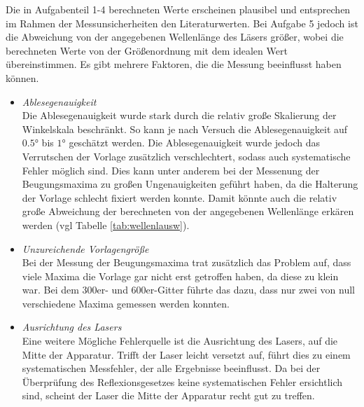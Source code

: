 Die in Aufgabenteil 1-4 berechneten Werte erscheinen plausibel und entsprechen im Rahmen der Messunsicherheiten
den Literaturwerten. Bei Aufgabe 5 jedoch ist die Abweichung von der angegebenen Wellenlänge des Läsers größer,
wobei die berechneten Werte von der Größenordnung mit dem idealen Wert übereinstimmen.
Es gibt mehrere Faktoren, die die Messung beeinflusst haben können.
\begin{itemize}
    \item \textit{Ablesegenauigkeit}
    \\\noindent
        Die Ablesegenauigkeit wurde stark durch die relativ große Skalierung der Winkelskala beschränkt.
        So kann je nach Versuch die Ablesegenauigkeit auf $\num{0.5}°$ bis $\num{1}°$ geschätzt werden.
        Die Ablesegenauigkeit wurde jedoch das Verrutschen der Vorlage zusätzlich verschlechtert, sodass
        auch systematische Fehler möglich sind. Dies kann unter anderem bei der Messenung der Beugungsmaxima
        zu großen Ungenauigkeiten geführt haben, da die Halterung der Vorlage schlecht fixiert werden konnte.
        Damit könnte auch die relativ große Abweichung der berechneten von der angegebenen Wellenlänge
        erkären werden (vgl Tabelle \ref{tab:wellenlausw}).
    \item \textit{Unzureichende Vorlagengröße}
    \\\noindent
        Bei der Messung der Beugungsmaxima trat zusätzlich das Problem auf, dass viele Maxima die Vorlage
        gar nicht erst getroffen haben, da diese zu klein war. Bei dem 300er- und 600er-Gitter führte das dazu,
        dass nur zwei von null verschiedene Maxima gemessen werden konnten.
    \item \textit{Ausrichtung des Lasers}
    \\\noindent
        Eine weitere Mögliche Fehlerquelle ist die Ausrichtung des Lasers, auf die Mitte der Apparatur. Trifft
        der Laser leicht versetzt auf, führt dies zu einem systematischen Messfehler, der alle Ergebnisse
        beeinflusst. Da bei der Überprüfung des Reflexionsgesetzes keine systematischen Fehler ersichtlich sind,
        scheint der Laser die Mitte der Apparatur recht gut zu treffen.
\end{itemize}
